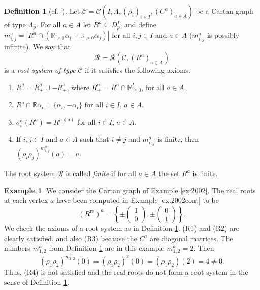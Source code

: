 \documentclass[11pt,a4paper]{amsart}
\theoremstyle{definition}
\newtheorem{Definition}[Lemma]{Definition}
\newtheorem{Example}[Lemma]{Example}
\numberwithin{equation}{section}
\newcommand{\rsC }{\mathcal{R}}
\newcommand{\rfl }{\rho }
\newcommand{\Cm }{C}
\newcommand{\Cc }{\mathcal{C}}
\newcommand{\s }{\sigma }
\newcommand{\Ri}{D_p}
\begin{document}
\begin{Definition}[cf.\ {\cite[Def.\ 2.2]{p-CH09a}}] \label{def:rootsystem}
Let $\Cc =\Cc (I,A,(\rfl _i)_{i\in I},(\Cm ^a)_{a\in A})$ be a Cartan
graph of type $\Lambda_p$. For all $a\in A$ let $R^a\subseteq \Ri^I$, and define
$m_{i,j}^a= |R^a \cap (\mathbb{R}_{\ge 0} \alpha_i + \mathbb{R}_{\ge 0} \alpha_j)|$ for all $i,j\in
I$ and $a\in A$ ($m_{i,j}^a$ is possibly infinite).
We say that
\[ \rsC = \rsC (\Cc , (R^a)_{a\in A}) \]
is a \emph{root system of type} $\Cc$ if it satisfies the following
axioms.
\begin{enumerate}
\item[(R1)]
$R^a=R^a_+\cup - R^a_+$, where $R^a_+=R^a\cap \mathbb{R}_{\ge 0}^I$, for all
$a\in A$.
\item[(R2)]
$R^a\cap \mathbb{R}\alpha_i=\{\alpha_i,-\alpha_i\}$ for all $i\in I$, $a\in A$.
\item[(R3)]
$\s _i^a(R^a) = R^{\rfl _i(a)}$ for all $i\in I$, $a\in A$.
\item[(R4)]
If $i,j\in I$ and $a\in A$ such that $i\not=j$ and $m_{i,j}^a$ is
finite, then
$(\rfl _i\rfl _j)^{m_{i,j}^a}(a)=a$.
\end{enumerate}
\end{Definition}

The root system $\rsC $ is called \emph{finite} if for all $a\in A$ the set $R^a$ is finite.


\begin{Example}
    We consider the Cartan graph of Example 
    \ref{ex:2002}. The real roots at each vertex $a$ have been computed in 
    Example \ref{ex:2002cont} to be
    $$(R^{\mathrm{re}})^a = \left\{ \pm
    \begin{pmatrix} 1\\0 \end{pmatrix},
    \pm
    \begin{pmatrix} 0\\1 \end{pmatrix}
    \right\}.
    $$ 
    We check the axioms of a root system
    as in Definition \ref{def:rootsystem}. 
    (R1) and (R2) are clearly satisfied, and
    also (R3) because the $C^a$ are diagonal
    matrices. The numbers $m_{1,2}^a$ from
    Definition \ref{def:rootsystem} are in this example $m_{1,2}^a= 2$. Then
    $$(\rho_1\rho_2)^{m_{1,2}^0}(0)
    = (\rho_1\rho_2)^2(0) = (\rho_1\rho_2)(2)
    = 4 \neq 0.
    $$
    Thus, (R4) is not satisfied and the real
    roots do not form a root system in the
    sense of Definition \ref{def:rootsystem}. 
\end{Example}
\end{document}
